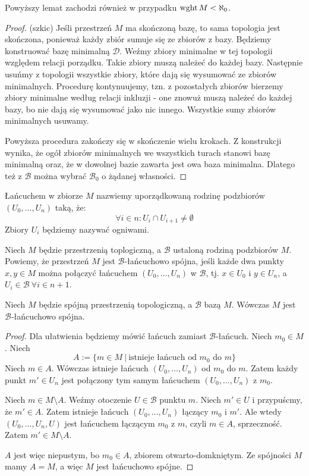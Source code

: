 \begin{fact}
  Powyższy lemat zachodzi również w przypadku $\operatorname{wght} M < \aleph_0$.
  \begin{proof}(szkic)
    Jeśli przestrzeń $M$ ma skończoną bazę, to sama topologia jest skończona, ponieważ każdy zbiór sumuje się ze zbiorów z bazy. Będziemy konstruować bazę minimalną $\mathcal D$. Weźmy zbiory minimalne w tej topologii względem relacji porządku. Takie zbiory muszą należeć do każdej bazy. Następnie usuńmy z topologii wszystkie zbiory, które dają się wysumować ze zbiorów minimalnych. Procedurę kontynuujemy, tzn. z pozostałych zbiorów bierzemy zbiory minimalne według relacji inkluzji - one znowuż muszą należeć do każdej bazy, bo nie dają się wysumować jako nic innego. Wszystkie sumy zbiorów minimalnych usuwamy.
    
    Powyższa procedura zakończy się w skończenie wielu krokach. Z konstrukcji wynika, że ogół zbiorów minimalnych we wszystkich turach stanowi bazę minimalną oraz, że w dowolnej bazie zawarta jest owa baza minimalna. Dlatego też z $\mathcal B$ można wybrać $\mathcal B_0$ o żądanej własności.
  \end{proof}
\end{fact}

\begin{df}
  Łańcuchem w zbiorze $M$ nazwiemy uporządkowaną rodzinę podzbiorów $(U_0, \ldots, U_n)$ taką, że:
  \[
    \forall i \in n: U_i \cap U_{i+1} \neq \emptyset
  \]
  Zbiory $U_i$ będziemy nazywać ogniwami.
\end{df}
\begin{df}
  Niech $M$ będzie przestrzenią toplogiczną, a $\mathcal B$ ustaloną rodziną podzbiorów $M$. Powiemy, że przestrzeń $M$ jest $\mathcal B$-łańcuchowo spójna, jeśli każde dwa punkty $x,y \in M$ można połączyć łańcuchem $(U_0, \ldots, U_n)$ w $\mathcal B$, tj. $x \in U_0$ i $y \in U_n$, a $U_i \in \mathcal B\ \forall i \in n+1$.
\end{df}

\begin{lem} \label{lem:chain-connected}
  Niech $M$ będzie spójną przestrzenią topologiczną, a $\mathcal B$ bazą $M$. Wówczas $M$ jest $\mathcal B$-łańcuchowo spójna.
  \begin{proof}
    Dla ułatwienia będziemy mówić łańcuch zamiast $\mathcal B$-łańcuch.
    Niech $m_0 \in M$. Niech
    \[
      A := \{m \in M\ |\ \mbox{istnieje łańcuch od $m_0$ do $m$}\}
    \]
    Niech $m \in A$.
    Wówczas istnieje łańcuch $(U_0, \ldots, U_n)$ od $m_0$ do $m$.
    Zatem każdy punkt $m' \in U_n$ jest połączony tym samym łańcuchem $(U_0, \ldots, U_n)$ z $m_0$.
    
    Niech $m \in M\setminus A$.
    Weźmy otoczenie $U\in\mathcal B$ punktu $m$. Niech $m'\in U$ i przypuścmy, że $m'\in A$. Zatem istnieje łańcuch $(U_0, \ldots, U_n)$ łączący $m_0$ i $m'$. Ale wtedy $(U_0, \ldots, U_n, U)$ jest łańcuchem łączącym $m_0$ z $m$, czyli $m\in A$, sprzeczność. Zatem $m'\in M\setminus A$.
    
    $A$ jest więc niepustym, bo $m_0 \in A$, zbiorem otwarto-domkniętym. Ze spójności $M$ mamy $A = M$, a więc $M$ jest łańcuchowo spójne.
  \end{proof}
\end{lem}

